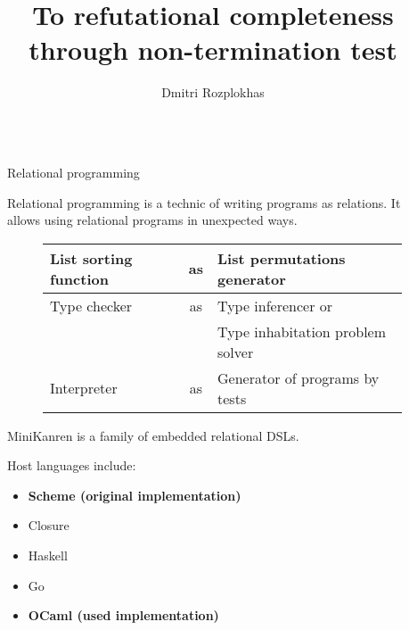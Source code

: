 \documentclass[final]{beamer}
\title{To refutational completeness through non-termination test} %
\author{Dmitri Rozplokhas} %
\institute{Saint-Petersburg Academic University} %
\newlength{\sepwid}
\newlength{\onecolwid}
\begin{document}

\setlength{\belowcaptionskip}{2ex} %
\setlength\belowdisplayshortskip{2ex} %

\begin{frame}[fragile] %

\begin{columns}[t] %


\begin{column}{\sepwid}\end{column} %


\begin{column}{\onecolwid} %

\begin{block}{Relational programming}

Relational programming is a technic of writing programs as relations. It allows using relational programs in unexpected ways.

\begin{figure}
  \begin{tabular}{ | l c l | }
    \hline
    List sorting function & as & List permutations generator          \\
    \hline
    Type checker            & as & Type inferencer or                         \\
                                       &      & Type inhabitation problem solver \\
    \hline
    Interpreter                 & as & Generator of programs by tests   \\
    \hline
  \end{tabular}
\end{figure}

MiniKanren is a family of embedded relational DSLs.

Host languages include:

\begin{itemize}
  \item \textbf{Scheme (original implementation)}
  \item Closure
  \item Haskell
  \item Go
  \item \textbf{OCaml (used implementation)}
\end{itemize}


\end{block}
\end{column}
\end{columns}
\end{frame}
\end{document}
